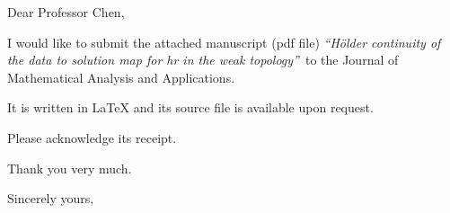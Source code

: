  \textheight 9.3in
\pagestyle{empty}


%
%

\headheight 0mm
\noheadings
\vspace*{-.75in}
\notredame
\vspace*{.75in}

\signature{David Karapetyan\\
E-mail: dkarapet@nd.edu
\\Phone: (574)-631-5706}




Dear Professor Chen,

I would like to submit the attached manuscript (pdf file) {\it ``H\"older continuity of the data to solution map for hr in the
weak topology''}\ to the Journal of Mathematical Analysis and Applications.

It is written in LaTeX and its source file is available upon request.
 
Please acknowledge its receipt.

Thank you very much.





\closing{Sincerely yours,}

